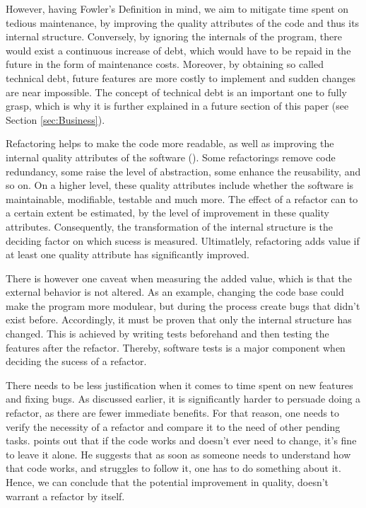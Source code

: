 However, having Fowler's Definition in mind, 
	we aim to mitigate time spent on tedious maintenance, 
	by improving the quality attributes of the code and thus its internal structure.
Conversely, by ignoring the internals of the program, 
	there would exist a continuous increase of debt, 
	which would have to be repaid in the future in the form of maintenance costs.
Moreover, by obtaining so called technical debt, 
	future features are more costly to implement and sudden changes are near impossible. 
The concept of technical debt is an important one to fully grasp, 
	which is why it is further explained in a future section of this paper 
(see Section \ref{sec:Business}).
	

Refactoring helps to make the code more readable, 
	as well as improving the internal quality attributes of the software (\cite[p.~129]{mens2004}). 
Some refactorings remove code redundancy, 
	some raise the level of abstraction, 
	some enhance the reusability, and so on.
On a higher level, these quality attributes include whether the software is maintainable, modifiable, testable and much more.
The effect of a refactor can to a certain extent be estimated, 
	by the level of improvement in these quality attributes.
Consequently, the transformation of the internal structure 
	is the deciding factor on which sucess is measured.
Ultimatlely, refactoring adds value if at least one quality attribute has significantly improved.

There is however one caveat when measuring the added value,
	which is that the external behavior is not altered. 
As an example, changing the code base could make the program more modulear, 
	but during the process create bugs that didn't exist before. 
Accordingly, it must be proven that only the internal structure has changed.
This is achieved by writing tests beforehand and then testing the features after the refactor.
Thereby, software tests is a major component when deciding the sucess of a refactor.




There needs to be less justification when it comes to time spent on new features and fixing bugs.
As discussed earlier, it is significantly harder to persuade doing a refactor, 
	as there are fewer immediate benefits.
For that reason, one needs to verify the necessity of a refactor 
	and compare it to the need of other pending tasks.
\textcite[p.~5]{fowler2018} points out that if the code works and doesn't ever need to change, 
	it's fine to leave it alone.
He suggests that as soon as someone needs to understand how that code works, 
	and struggles to follow it, one has to do something about it.
Hence, we can conclude that the potential improvement in quality, doesn't warrant a refactor by itself.


